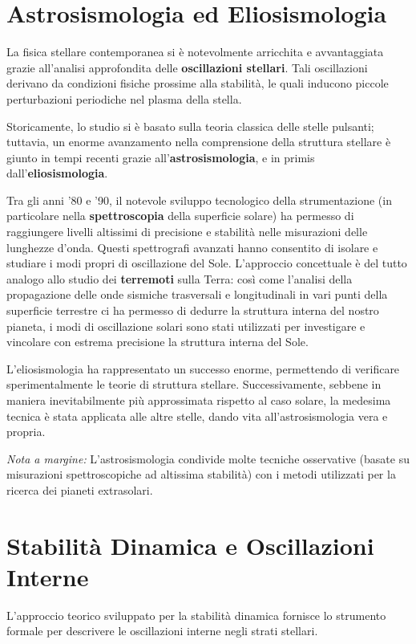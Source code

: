 \section{Astrosismologia ed Eliosismologia}

La fisica stellare contemporanea si è notevolmente arricchita e avvantaggiata grazie all'analisi approfondita delle \textbf{oscillazioni stellari}. Tali oscillazioni derivano da condizioni fisiche prossime alla stabilità, le quali inducono piccole perturbazioni periodiche nel plasma della stella.

Storicamente, lo studio si è basato sulla teoria classica delle stelle pulsanti; tuttavia, un enorme avanzamento nella comprensione della struttura stellare è giunto in tempi recenti grazie all'\textbf{astrosismologia}, e in primis dall'\textbf{eliosismologia}.

Tra gli anni '80 e '90, il notevole sviluppo tecnologico della strumentazione (in particolare nella \textbf{spettroscopia} della superficie solare) ha permesso di raggiungere livelli altissimi di precisione e stabilità nelle misurazioni delle lunghezze d'onda. Questi spettrografi avanzati hanno consentito di isolare e studiare i modi propri di oscillazione del Sole. L'approccio concettuale è del tutto analogo allo studio dei \textbf{terremoti} sulla Terra: così come l'analisi della propagazione delle onde sismiche trasversali e longitudinali in vari punti della superficie terrestre ci ha permesso di dedurre la struttura interna del nostro pianeta, i modi di oscillazione solari sono stati utilizzati per investigare e vincolare con estrema precisione la struttura interna del Sole.

L'eliosismologia ha rappresentato un successo enorme, permettendo di verificare sperimentalmente le teorie di struttura stellare. Successivamente, sebbene in maniera inevitabilmente più approssimata rispetto al caso solare, la medesima tecnica è stata applicata alle altre stelle, dando vita all'astrosismologia vera e propria.

\textit{Nota a margine:} L'astrosismologia condivide molte tecniche osservative (basate su misurazioni spettroscopiche ad altissima stabilità) con i metodi utilizzati per la ricerca dei pianeti extrasolari.

\section{Stabilità Dinamica e Oscillazioni Interne}

L'approccio teorico sviluppato per la stabilità dinamica fornisce lo strumento formale per descrivere le oscillazioni interne negli strati stellari.

